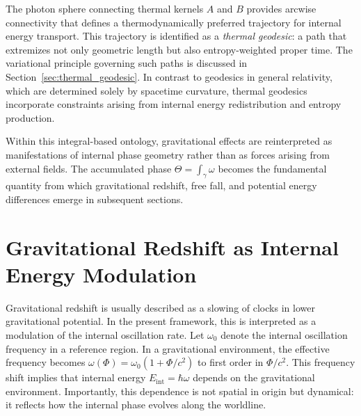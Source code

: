 \documentclass[%
 reprint,
 amsmath,amssymb,
 aps,
 prb,
]{revtex4-2}
\numberwithin{equation}{section}
\begin{document}
The photon sphere connecting thermal kernels $A$ and $B$ provides arcwise connectivity that defines a thermodynamically preferred trajectory for internal energy transport. This trajectory is identified as a \emph{thermal geodesic}: a path that extremizes not only geometric length but also entropy-weighted proper time. The variational principle governing such paths is discussed in Section~\ref{sec:thermal_geodesic}. In contrast to geodesics in general relativity, which are determined solely by spacetime curvature, thermal geodesics incorporate constraints arising from internal energy redistribution and entropy production.

Within this integral-based ontology, gravitational effects are reinterpreted as manifestations of internal phase geometry rather than as forces arising from external fields. The accumulated phase $\Theta = \int_\gamma \omega$ becomes the fundamental quantity from which gravitational redshift, free fall, and potential energy differences emerge in subsequent sections.


\section{Gravitational Redshift as Internal Energy Modulation}
\label{sec:grav_redshift}

Gravitational redshift is usually described as a slowing of clocks in lower gravitational potential. In the present framework, this is interpreted as a modulation of the internal oscillation rate. Let $\omega_0$ denote the internal oscillation frequency in a reference region. In a gravitational environment, the effective frequency becomes $\omega(\Phi) = \omega_0 (1 + \Phi/c^2)$ to first order in $\Phi/c^2$. This frequency shift implies that internal energy $E_{\text{int}} = \hbar \omega$ depends on the gravitational environment. Importantly, this dependence is not spatial in origin but dynamical: it reflects how the internal phase evolves along the worldline.
\end{document}
